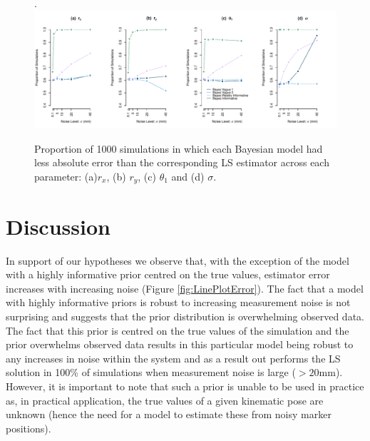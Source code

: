 \documentclass{article}
\begin{document}
\begin{figure}.
	\centering
	\includegraphics[width = \linewidth]{./Figures/LinePlot-Perf-legend}
	\caption{Proportion of 1000 simulations in which each Bayesian model had less absolute error than the corresponding LS estimator across each parameter: (a)$r_x$, (b) $r_y$, (c) $\theta_1$ and (d) $\sigma$. }
	\label{fig:LinePlotPerf}
\end{figure}

\section{Discussion}
In support of our hypotheses we observe that, with the exception of the model with a highly informative prior centred on the true values, estimator error increases with increasing noise (Figure \ref{fig:LinePlotError}).  The fact that a model with highly informative priors is robust to increasing measurement noise is not surprising and suggests that the prior distribution is overwhelming observed data. The fact that this prior is centred on the true values of the simulation and the prior overwhelms observed data results in this particular model being robust to any increases in noise within the system and as a result out performs the LS solution in 100\% of simulations when measurement noise is large ($>20\si{\milli\meter}$). However, it is important to note that such a prior is unable to be used in practice as, in practical application, the true values of a given kinematic pose are unknown (hence the need for a model to estimate these from noisy marker positions).
\end{document}
